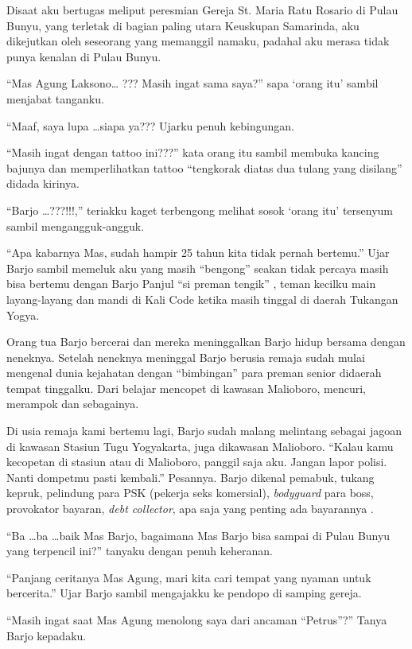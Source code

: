 	Disaat aku bertugas meliput peresmian Gereja St. Maria Ratu Rosario di Pulau Bunyu,  yang terletak di bagian paling utara Keuskupan Samarinda, aku dikejutkan oleh seseorang yang memanggil namaku, padahal aku merasa tidak punya kenalan di Pulau Bunyu.
	
``Mas Agung Laksono… ???  Masih ingat sama saya?'' sapa `orang itu' sambil menjabat tanganku.

``Maaf, saya lupa \dots siapa ya??? Ujarku penuh kebingungan.

``Masih ingat dengan tattoo ini???'' kata orang itu sambil membuka kancing bajunya dan memperlihatkan tattoo ``tengkorak diatas dua tulang yang disilang'' didada kirinya.

``Barjo \dots ???!!!,'' teriakku kaget terbengong melihat sosok `orang itu' tersenyum sambil mengangguk-angguk.

``Apa kabarnya Mas, sudah hampir 25 tahun kita tidak pernah bertemu.'' Ujar Barjo sambil memeluk aku yang masih  ``bengong'' seakan tidak percaya masih bisa bertemu dengan Barjo Panjul ``si preman tengik'' , teman kecilku main layang-layang dan mandi di Kali Code ketika masih tinggal  di daerah Tukangan Yogya. 

Orang tua Barjo bercerai dan mereka meninggalkan Barjo hidup bersama dengan neneknya. Setelah neneknya meninggal Barjo berusia remaja sudah mulai mengenal dunia kejahatan dengan ``bimbingan'' para preman senior didaerah tempat tinggalku. Dari belajar mencopet di kawasan Malioboro, mencuri, merampok dan sebagainya.
 
Di usia remaja kami bertemu lagi, Barjo sudah malang melintang sebagai jagoan di kawasan Stasiun Tugu Yogyakarta, juga dikawasan Malioboro. ``Kalau kamu kecopetan di stasiun atau di Malioboro, panggil saja aku. Jangan lapor polisi. Nanti dompetmu pasti kembali.'' Pesannya.  Barjo dikenal pemabuk, tukang kepruk, pelindung para PSK (pekerja seks komersial), \textit{bodyguard} para boss, provokator bayaran, \textit{debt collector}, apa saja yang penting ada bayarannya . 

``Ba \dots ba \dots baik Mas Barjo, bagaimana Mas Barjo bisa sampai di Pulau Bunyu yang terpencil ini?'' tanyaku dengan penuh keheranan.

``Panjang ceritanya Mas Agung, mari kita cari tempat yang nyaman untuk bercerita.'' Ujar Barjo sambil mengajakku ke pendopo di samping gereja.

``Masih ingat saat Mas Agung menolong saya dari ancaman ``Petrus''?'' Tanya Barjo kepadaku.

